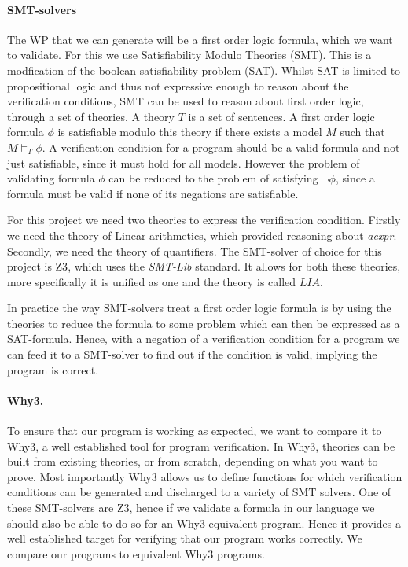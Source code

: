 \paragraph{SMT-solvers}
The WP that we can generate will be a first order logic formula, which we want to validate. For this we use Satisfiability Modulo Theories (SMT).
This is a modfication of the boolean satisfiability problem (SAT).
Whilst SAT is limited to propositional logic and thus not expressive enough to reason about the verification conditions, SMT can be used to reason about first order logic, through a set of theories.
A theory $T$ is a set of sentences.
A first order logic formula $\phi$ is satisfiable modulo this theory if there exists a model $M$ such that $M \vDash_{T}\phi$. A verification condition for a program should be a valid formula and not just satisfiable, since it must hold for all models. However the problem of validating formula $\phi$ can be reduced to the problem of satisfying $\neg \phi$, since a formula must be valid if none of its negations are satisfiable.

For this project we need two theories to express the verification condition. 
Firstly we need the theory of Linear arithmetics, which provided reasoning about \textit{aexpr}. 
Secondly, we need the theory of quantifiers. The SMT-solver of choice for this project is Z3\cite{z3}, which uses the \textit{SMT-Lib} standard. It allows for both these theories, more specifically it is unified as one and the theory is called $LIA$\cite{smtlib}.

In practice the way SMT-solvers treat a first order logic formula is by using the theories to reduce the formula to some problem which can then be expressed as a SAT-formula. 
Hence, with a negation of a verification condition for a program we can feed it to a SMT-solver to find out if the condition is valid, implying the program is correct.

\paragraph{Why3.}
To ensure that our program is working as expected, we want to compare it to Why3, a well established tool for program verification\cite{why3}.
In Why3, theories can be built from existing theories, or from scratch, depending on what you want to prove.
Most importantly Why3 allows us to define functions for which verification conditions can be generated and discharged to a variety of SMT solvers.
One of these SMT-solvers are Z3, hence if we validate a formula in our language we should also be able to do so for an Why3 equivalent program.
Hence it provides a well established target for verifying that our program works correctly. We compare our programs to equivalent Why3 programs.
